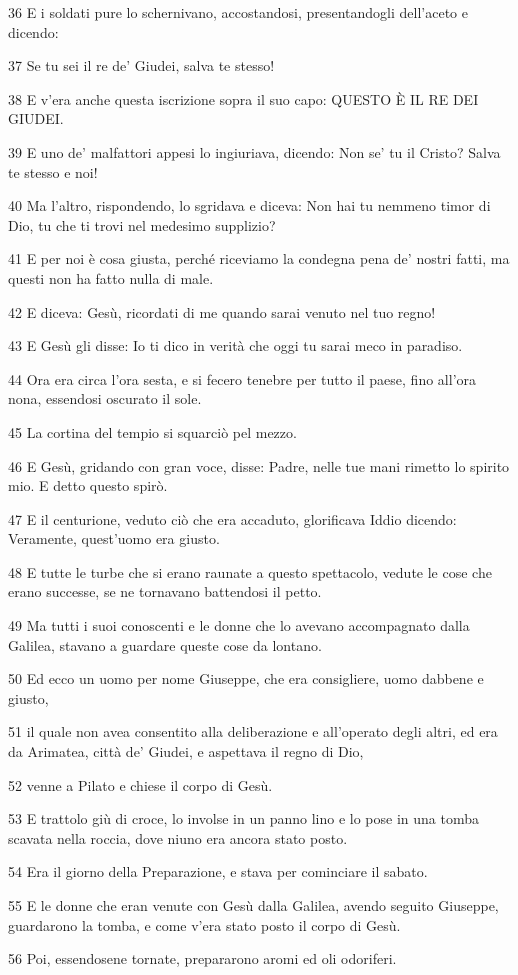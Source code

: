 \par 36 E i soldati pure lo schernivano, accostandosi, presentandogli dell'aceto e dicendo:
\par 37 Se tu sei il re de' Giudei, salva te stesso!
\par 38 E v'era anche questa iscrizione sopra il suo capo: QUESTO È IL RE DEI GIUDEI.
\par 39 E uno de' malfattori appesi lo ingiuriava, dicendo: Non se' tu il Cristo? Salva te stesso e noi!
\par 40 Ma l'altro, rispondendo, lo sgridava e diceva: Non hai tu nemmeno timor di Dio, tu che ti trovi nel medesimo supplizio?
\par 41 E per noi è cosa giusta, perché riceviamo la condegna pena de' nostri fatti, ma questi non ha fatto nulla di male.
\par 42 E diceva: Gesù, ricordati di me quando sarai venuto nel tuo regno!
\par 43 E Gesù gli disse: Io ti dico in verità che oggi tu sarai meco in paradiso.
\par 44 Ora era circa l'ora sesta, e si fecero tenebre per tutto il paese, fino all'ora nona, essendosi oscurato il sole.
\par 45 La cortina del tempio si squarciò pel mezzo.
\par 46 E Gesù, gridando con gran voce, disse: Padre, nelle tue mani rimetto lo spirito mio. E detto questo spirò.
\par 47 E il centurione, veduto ciò che era accaduto, glorificava Iddio dicendo: Veramente, quest'uomo era giusto.
\par 48 E tutte le turbe che si erano raunate a questo spettacolo, vedute le cose che erano successe, se ne tornavano battendosi il petto.
\par 49 Ma tutti i suoi conoscenti e le donne che lo avevano accompagnato dalla Galilea, stavano a guardare queste cose da lontano.
\par 50 Ed ecco un uomo per nome Giuseppe, che era consigliere, uomo dabbene e giusto,
\par 51 il quale non avea consentito alla deliberazione e all'operato degli altri, ed era da Arimatea, città de' Giudei, e aspettava il regno di Dio,
\par 52 venne a Pilato e chiese il corpo di Gesù.
\par 53 E trattolo giù di croce, lo involse in un panno lino e lo pose in una tomba scavata nella roccia, dove niuno era ancora stato posto.
\par 54 Era il giorno della Preparazione, e stava per cominciare il sabato.
\par 55 E le donne che eran venute con Gesù dalla Galilea, avendo seguito Giuseppe, guardarono la tomba, e come v'era stato posto il corpo di Gesù.
\par 56 Poi, essendosene tornate, prepararono aromi ed oli odoriferi.

